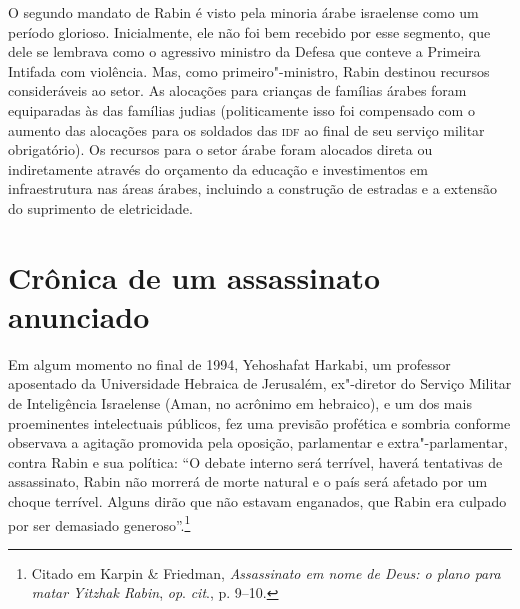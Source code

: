 
O segundo mandato de Rabin é visto pela minoria árabe israelense como um
período glorioso. Inicialmente, ele não foi bem recebido por esse
segmento, que dele se lembrava como o agressivo ministro da Defesa que
conteve a Primeira Intifada com violência. Mas, como primeiro"-ministro,
Rabin destinou recursos consideráveis ao setor. As alocações para
crianças de famílias árabes foram equiparadas às das famílias judias
(politicamente isso foi compensado com o aumento das alocações para os
soldados das \textsc{idf} ao final de seu serviço militar obrigatório). Os
recursos para o setor árabe foram alocados direta ou indiretamente
através do orçamento da educação e investimentos em infraestrutura nas
áreas árabes, incluindo a construção de estradas e a extensão do
suprimento de eletricidade.

\section{Crônica de um assassinato anunciado}

Em algum momento no final de 1994, Yehoshafat Harkabi, um professor
aposentado da Universidade Hebraica de Jerusalém, ex"-diretor do Serviço
Militar de Inteligência Israelense (Aman, no acrônimo em hebraico), e um dos mais proeminentes intelectuais
públicos, fez uma previsão profética e sombria conforme observava a
agitação promovida pela oposição, parlamentar e extra"-parlamentar,
contra Rabin e sua política: ``O debate interno será terrível, haverá
tentativas de assassinato, Rabin não morrerá de morte natural e o país
será afetado por um choque terrível. Alguns dirão que não estavam
enganados, que Rabin era culpado por ser demasiado generoso''.\footnote{Citado em Karpin
\& Friedman, \textit{Assassinato em nome de Deus: o plano para matar Yitzhak
Rabin}, \textit{op}. \textit{cit}., p. 9--10.}

